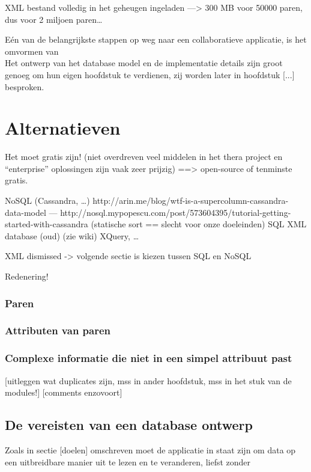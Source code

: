 

XML bestand volledig in het geheugen ingeladen ---> 300 MB voor 50000 paren, dus voor 2 miljoen paren\ldots

E\'en van de belangrijkste stappen op weg naar een collaboratieve applicatie, is het omvormen van\\

Het ontwerp van het database model en de implementatie details zijn groot genoeg om hun eigen hoofdstuk te verdienen, zij worden later in hoofdstuk [...] besproken.\\

\section{Alternatieven}
Het moet gratis zijn! (niet overdreven veel middelen in het thera project en ``enterprise'' oplossingen zijn vaak zeer prijzig) ==> open-source of tenminste gratis.

NoSQL (Cassandra, \ldots) http://arin.me/blog/wtf-is-a-supercolumn-cassandra-data-model --- http://nosql.mypopescu.com/post/573604395/tutorial-getting-started-with-cassandra (statische sort == slecht voor onze doeleinden)
SQL
XML database (oud) (zie wiki) XQuery, \ldots

XML dismissed -> volgende sectie is kiezen tussen SQL en NoSQL

Redenering!

\subsubsection{Paren}

\subsubsection{Attributen van paren}

\subsubsection{Complexe informatie die niet in een simpel attribuut past}

[uitleggen wat duplicates zijn, mss in ander hoofdstuk, mss in het stuk van de modules!]
[comments enzovoort]

\subsection{De vereisten van een database ontwerp}
Zoals in sectie [doelen] omschreven moet de applicatie in staat zijn om data op een uitbreidbare manier uit te lezen en te veranderen, liefst zonder 

